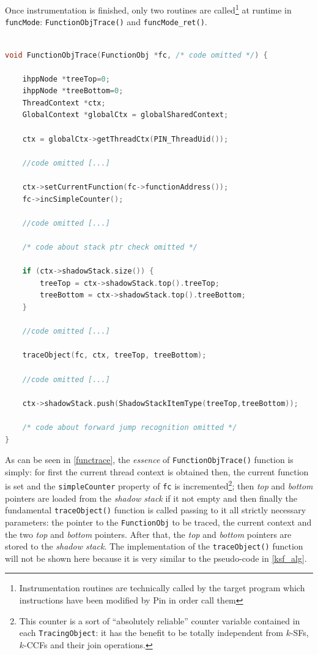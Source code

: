 \documentclass[a4paper,10pt]{report}
\begin{document}
Once instrumentation is finished, only two routines are 
called\footnote{Instrumentation routines are technically called by the target program
which instructions have been modified by Pin in order call them}
at runtime in \verb|funcMode|: \verb|FunctionObjTrace()| and \verb|funcMode_ret()|.

\begin{lstlisting}[language=C++, 
	caption={a fragment of \texttt{FunctionObjTrace()} routine}, 
	label=functrace, frame=leftline]

void FunctionObjTrace(FunctionObj *fc, /* code omitted */) {

	ihppNode *treeTop=0;
	ihppNode *treeBottom=0;	
	ThreadContext *ctx;
	GlobalContext *globalCtx = globalSharedContext;

	ctx = globalCtx->getThreadCtx(PIN_ThreadUid());

	//code omitted [...]

	ctx->setCurrentFunction(fc->functionAddress());
	fc->incSimpleCounter();

	//code omitted [...]

	/* code about stack ptr check omitted */

	if (ctx->shadowStack.size()) {
		treeTop = ctx->shadowStack.top().treeTop; 
		treeBottom = ctx->shadowStack.top().treeBottom;
	} 

	//code omitted [...]

	traceObject(fc, ctx, treeTop, treeBottom);

	//code omitted [...]

	ctx->shadowStack.push(ShadowStackItemType(treeTop,treeBottom));

	/* code about forward jump recognition omitted */
}

\end{lstlisting}

\noindent
As can be seen in \cref{functrace}, the \emph{essence} of \verb|FunctionObjTrace()|
function is simply: for first the current thread context is obtained then, 
the current function is set and the \verb|simpleCounter| property of \verb|fc|
is incremented\footnote{This counter is 
a sort of ``absolutely reliable'' counter variable contained in each \texttt{TracingObject}:
it has the benefit to be totally independent from $k$-SFs, $k$-CCFs and their join
operations.}; then \emph{top} and \emph{bottom} pointers are loaded from the 
\emph{shadow stack} if it not empty and then finally the fundamental \verb|traceObject()|
function is called passing to it all strictly necessary parameters: 
the pointer to the \verb|FunctionObj| to be traced, the current context and the
two \emph{top} and \emph{bottom} pointers. After that, the \emph{top} and \emph{bottom} pointers are stored to the \emph{shadow stack}. 
The implementation of the \verb|traceObject()| function will not be shown here
because it is very similar to the pseudo-code in \cref{ksf_alg}.
\end{document}
